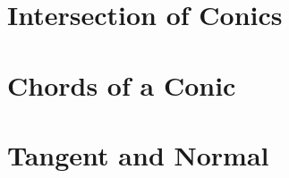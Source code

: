 \documentclass[11pt]{book}
\begin{document}
\section{Intersection of Conics}

\section{ Chords of a Conic}

\section{ Tangent and Normal}

\fi
%

%
%
%
\latexprintindex
\end{document}
